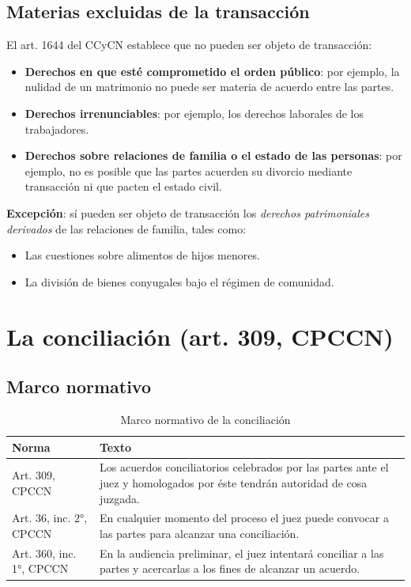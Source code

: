 \documentclass[12pt,oneside]{book}
\begin{document}
\section{Materias excluidas de la transacción}

El art. 1644 del CCyCN establece que no pueden ser objeto de transacción:

\begin{itemize}
    \item \textbf{Derechos en que esté comprometido el orden público}: por ejemplo, la nulidad de un matrimonio no puede ser materia de acuerdo entre las partes.
    \item \textbf{Derechos irrenunciables}: por ejemplo, los derechos laborales de los trabajadores.
    \item \textbf{Derechos sobre relaciones de familia o el estado de las personas}: por ejemplo, no es posible que las partes acuerden su divorcio mediante transacción ni que pacten el estado civil.
\end{itemize}

\textbf{Excepción}: sí pueden ser objeto de transacción los \emph{derechos patrimoniales derivados} de las relaciones de familia, tales como:

\begin{itemize}
    \item Las cuestiones sobre alimentos de hijos menores.
    \item La división de bienes conyugales bajo el régimen de comunidad.
\end{itemize}

\chapter{La conciliación (art. 309, CPCCN)}

\section{Marco normativo}

\begin{table}[H]
\centering
\begin{tabularx}{\textwidth}{
    >{\raggedright\arraybackslash}p{}
    >{\raggedright\arraybackslash}X
}
\toprule
\textbf{Norma} & \textbf{Texto} \\
\midrule
Art. 309, CPCCN & Los acuerdos conciliatorios celebrados por las partes ante el juez y homologados por éste tendrán autoridad de cosa juzgada. \\
\addlinespace
Art. 36, inc. 2°, CPCCN & En cualquier momento del proceso el juez puede convocar a las partes para alcanzar una conciliación. \\
\addlinespace
Art. 360, inc. 1°, CPCCN & En la audiencia preliminar, el juez intentará conciliar a las partes y acercarlas a los fines de alcanzar un acuerdo. \\
\bottomrule
\end{tabularx}
\caption{Marco normativo de la conciliación}
\end{table}
\end{document}
